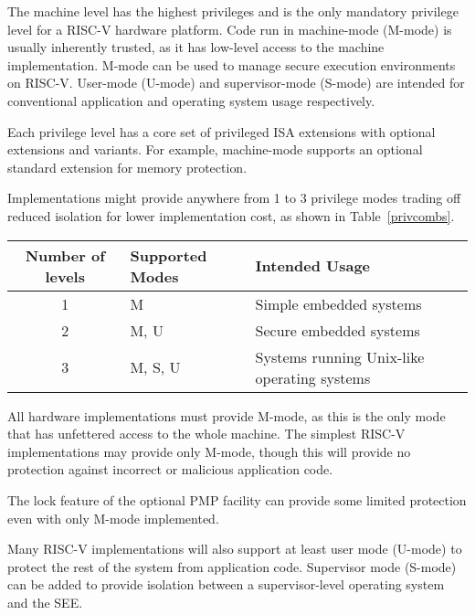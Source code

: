 The machine level has the highest privileges and is the only mandatory
privilege level for a RISC-V hardware platform.  Code run in
machine-mode (M-mode) is usually inherently trusted, as it has
low-level access to the machine implementation.  M-mode can be used to
manage secure execution environments on RISC-V.  User-mode (U-mode)
and supervisor-mode (S-mode) are intended for conventional application
and operating system usage respectively.

Each privilege level has a core set of privileged ISA extensions with optional
extensions and variants.  For example, machine-mode supports an optional
standard extension for memory protection.

Implementations might provide anywhere from 1 to 3 privilege modes
trading off reduced isolation for lower implementation cost, as shown
in Table~\ref{privcombs}.

\begin{table*}[h!]
\begin{center}
\begin{tabular}{|c|l|l|}
  \hline
   Number of levels &  Supported Modes & Intended Usage \\ \hline  
   1     & M          & Simple embedded systems \\ 
   2     & M, U       & Secure embedded systems \\ 
   3     & M, S, U    & Systems running Unix-like operating systems\\ 
  \hline
 \end{tabular}
\end{center}
\caption{Supported combinations of privilege modes.}
\label{privcombs}
\end{table*}

All hardware implementations must provide M-mode, as this is the only
mode that has unfettered access to the whole machine.  The simplest
RISC-V implementations may provide only M-mode, though this will
provide no protection against incorrect or malicious application code.

\begin{commentary}
  The lock feature of the optional PMP facility can provide some
  limited protection even with only M-mode implemented.
\end{commentary}

Many RISC-V implementations will also support at least user mode
(U-mode) to protect the rest of the system from application code.
Supervisor mode (S-mode) can be added to provide isolation between a
supervisor-level operating system and the SEE.

